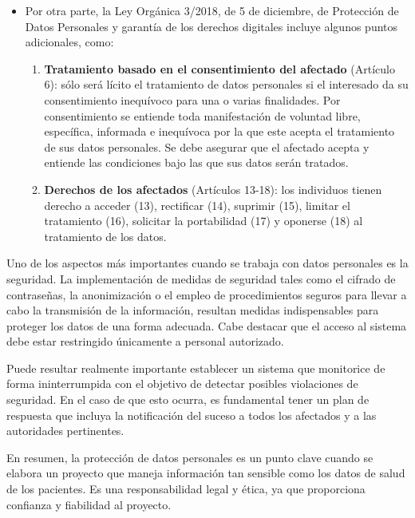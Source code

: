 \begin{itemize}
    \item Por otra parte, la Ley Orgánica 3/2018, de 5 de diciembre, de Protección de Datos Personales y garantía de los derechos digitales \cite{leyorgdat} incluye algunos puntos adicionales, como:
    \begin{enumerate}
        \item \textbf{Tratamiento basado en el consentimiento del afectado} (Artículo 6): sólo será lícito el tratamiento de datos personales si el interesado  da su consentimiento inequívoco para una o varias finalidades. Por consentimiento se entiende toda manifestación de voluntad libre, específica, informada e inequívoca por la que este acepta el tratamiento de sus datos personales. Se debe asegurar que el afectado acepta y entiende las condiciones bajo las que sus datos serán tratados.
        \item \textbf{Derechos de los afectados} (Artículos 13-18): los individuos tienen derecho a acceder (13), rectificar (14), suprimir (15), limitar el tratamiento (16), solicitar la portabilidad (17) y oponerse (18) al tratamiento de los datos.
    \end{enumerate}
\end{itemize}

Uno de los aspectos más importantes cuando se trabaja con datos personales es la seguridad. La implementación de medidas de seguridad tales como el cifrado de contraseñas, la anonimización o el empleo de procedimientos seguros para llevar a cabo la transmisión de la información, resultan medidas indispensables para proteger los datos de una forma adecuada. Cabe destacar que el acceso al sistema debe estar restringido únicamente a personal autorizado.


Puede resultar realmente importante establecer un sistema que monitorice de forma ininterrumpida con el objetivo de detectar posibles violaciones de seguridad. En el caso de que esto ocurra, es fundamental tener un plan de respuesta que incluya la notificación del suceso a todos los afectados y a las autoridades pertinentes.


En resumen, la protección de datos personales es un punto clave cuando se elabora un proyecto que maneja información tan sensible como los datos de salud de los pacientes. Es una responsabilidad legal y ética, ya que proporciona confianza y fiabilidad al proyecto.

